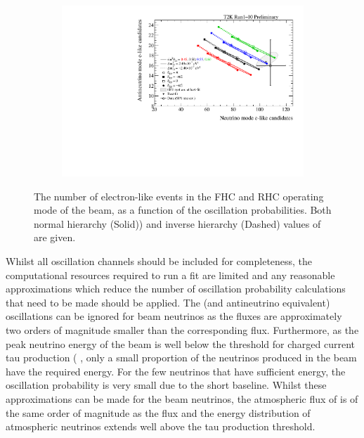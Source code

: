 \begin{figure}[h]
  \begin{subfigure}[t]{0.65\textwidth}
    \includegraphics[width=\textwidth, trim={0mm 0mm 0mm 0mm}, clip,page=1]{Figures/Oscillation/BiProbabilityPlot.pdf}
  \end{subfigure}
  \caption{The number of electron-like events in the FHC and RHC operating mode of the beam, as a function of the oscillation probabilities. Both normal hierarchy (Solid)) and inverse hierarchy (Dashed) values of \delmsqatm are given.}
  \label{fig:Oscillation_SK_BiProbabilityPlot}
\end{figure}

Whilst all oscillation channels should be included for completeness, the computational resources required to run a fit are limited and any reasonable approximations which reduce the number of oscillation probability calculations that need to be made should be applied. The  (and antineutrino equivalent) oscillations can be ignored for beam neutrinos as the  fluxes are approximately two orders of magnitude smaller than the corresponding \quickmath{\nu_{\mu}/\bar{\nu}_{\mu}} flux. Furthermore, as the peak neutrino energy of the beam is well below the threshold for charged current tau production ( \cite{Li_2018}, only a small proportion of the neutrinos produced in the beam have the required energy. For the few neutrinos that have sufficient energy, the oscillation probability is very small due to the short baseline. Whilst these approximations can be made for the beam neutrinos, the atmospheric flux of  is of the same order of magnitude as the \quickmath{\nu_{\mu}} flux and the energy distribution of atmospheric neutrinos extends well above the tau production threshold.


